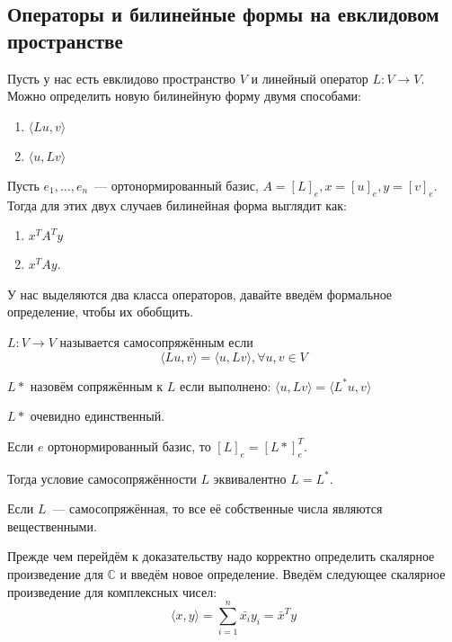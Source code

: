 \subsection{Операторы и билинейные формы на евклидовом пространстве}
Пусть у нас есть евклидово пространство $V$ и линейный оператор 
$L\colon V \to V$. Можно определить новую билинейную форму  двумя способами:
\begin{enumerate}
    \item $ \langle Lu, v \rangle$ 
    \item $\langle u, Lv \rangle$
\end{enumerate}
Пусть $e_1, \dots, e_n$~--- ортонормированный базис,
$A = [L]_e, x = [u]_e, y = [v]_e$.
Тогда для этих двух случаев билинейная форма выглядит как:
\begin{enumerate}
    \item $x^T A^T y$ 
    \item $x^T A y$.
\end{enumerate}
У нас выделяются два класса операторов, давайте введём формальное определение,
чтобы их обобщить.
\begin{definition}
    $L: V \to V$ называется самосопряжённым если 
    \[
        \langle Lu, v \rangle = \langle u, Lv \rangle, \forall u, v\in V
    \]
\end{definition}
\begin{definition}
    $L*$ назовём сопряжённым к $L$ если выполнено:
    $\langle u, Lv \rangle = \langle L^* u, v \rangle$
\end{definition}
\begin{remark}
    $L*$ очевидно единственный.
\end{remark}
\begin{remark}
    Если $e$ ортонормированный базис, то $[L]_e = [L*]_e^T$.
\end{remark}
\begin{follow}
    Тогда условие самосопряжённости $L$ эквивалентно $L = L^*$.
\end{follow}

\begin{statement}
    Если $L$~--- самосопряжённая, то все её собственные числа являются
    вещественными.
\end{statement}
Прежде чем перейдём к доказательству надо корректно определить 
скалярное произведение для $\mathbb{C}$ и введём новое определение.
Введём следующее скалярное произведение для комплексных чисел:
\[
    \langle x, y \rangle = \sum\limits_{i=1}^{n}{\bar{x_i}y_i} = \bar{x}^T y
\]

